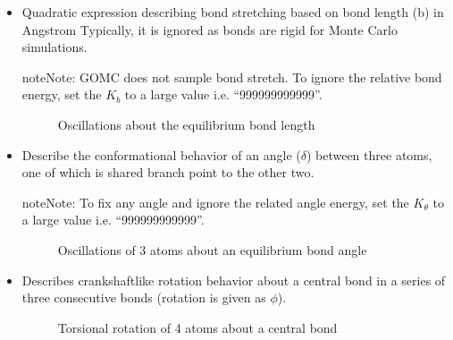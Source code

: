 \documentclass[letterpaper,10pt,english]{sphinxmanual}
\begin{document}
\begin{itemize}
\item {} 
\sphinxAtStartPar
{}
\sphinxhyphen{} Quadratic expression describing bond stretching based on bond length (b) in Angstrom
\textendash{} Typically, it is ignored as bonds are rigid for Monte Carlo simulations.

\begin{sphinxadmonition}{note}{Note:}
\sphinxAtStartPar
GOMC does not sample bond stretch. To ignore the relative bond energy, set the \(K_b\) to a large value i.e. “999999999999”.
\end{sphinxadmonition}

\begin{figure}[htbp]
\centering
\capstart

\noindent{}
\caption{Oscillations about the equilibrium bond length}\label{\detokenize{input_file:id1}}\end{figure}

\item {} 
\sphinxAtStartPar
{}
\sphinxhyphen{} Describe the conformational behavior of an angle (\(\delta\)) between three atoms, one of which is shared branch point to the other two.

\begin{sphinxadmonition}{note}{Note:}
\sphinxAtStartPar
To fix any angle and ignore the related angle energy, set the \(K_\theta\) to a large value i.e. “999999999999”.
\end{sphinxadmonition}

\begin{figure}[htbp]
\centering
\capstart

\noindent{}
\caption{Oscillations of 3 atoms about an equilibrium bond angle}\label{\detokenize{input_file:id2}}\end{figure}

\item {} 
\sphinxAtStartPar
{}
\sphinxhyphen{} Describes crankshaft\sphinxhyphen{}like rotation behavior about a central bond in a series of three consecutive bonds (rotation is given as \(\phi\)).

\begin{figure}[htbp]
\centering
\capstart

\noindent{}
\caption{Torsional rotation of 4 atoms about a central bond}\label{\detokenize{input_file:id3}}\end{figure}


\end{itemize}
\end{document}
